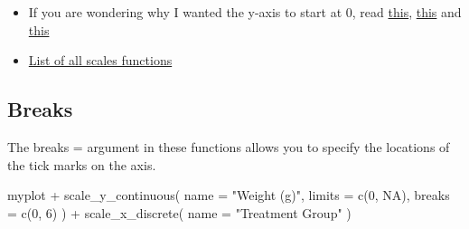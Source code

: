 \documentclass[
  letterpaper,
  DIV=11,
  numbers=noendperiod]{scrartcl}
\newenvironment{Shaded}{\begin{snugshade}}{\end{snugshade}}
\newcommand{\AttributeTok}[1]{\textcolor[rgb]{0.40,0.45,0.13}{#1}}
\newcommand{\ConstantTok}[1]{\textcolor[rgb]{0.56,0.35,0.01}{#1}}
\newcommand{\DecValTok}[1]{\textcolor[rgb]{0.68,0.00,0.00}{#1}}
\newcommand{\FunctionTok}[1]{\textcolor[rgb]{0.28,0.35,0.67}{#1}}
\newcommand{\NormalTok}[1]{\textcolor[rgb]{0.00,0.23,0.31}{#1}}
\newcommand{\SpecialCharTok}[1]{\textcolor[rgb]{0.37,0.37,0.37}{#1}}
\newcommand{\StringTok}[1]{\textcolor[rgb]{0.13,0.47,0.30}{#1}}
\providecommand{\tightlist}{%
  \setlength{\itemsep}{0pt}\setlength{\parskip}{0pt}}\usepackage{longtable,booktabs,array}
\begin{document}
\begin{tcolorbox}[enhanced jigsaw, left=2mm, title=\textcolor{quarto-callout-tip-color}{\faLightbulb}\hspace{0.5em}{Additional Resources}, toprule=.15mm, colback=white, coltitle=black, opacityback=0, breakable, titlerule=0mm, bottomtitle=1mm, toptitle=1mm, colbacktitle=quarto-callout-tip-color!10!white, arc=.35mm, rightrule=.15mm, bottomrule=.15mm, leftrule=.75mm, colframe=quarto-callout-tip-color-frame, opacitybacktitle=0.6]

\begin{itemize}
\tightlist
\item
  If you are wondering why I wanted the y-axis to start at 0, read
  \href{https://academy.datawrapper.de/article/326-why-our-column-and-bar-charts-start-at-zero}{this},
  \href{https://digitalblog.ons.gov.uk/2016/06/27/does-the-axis-have-to-start-at-zero-part-1-line-charts/}{this}
  and
  \href{https://stats.stackexchange.com/questions/184525/how-to-determine-whether-or-not-the-y-axis-of-a-graph-should-start-at-zero}{this}
\item
  \href{https://ggplot2.tidyverse.org/reference/index.html\#scales}{List
  of all scales functions}
\end{itemize}

\end{tcolorbox}

\hypertarget{breaks}{%
\subsection{Breaks}\label{breaks}}

The breaks = argument in these functions allows you to specify the
locations of the tick marks on the axis.

\begin{Shaded}
\begin{Highlighting}[]
\NormalTok{myplot }\SpecialCharTok{+}
  \FunctionTok{scale\_y\_continuous}\NormalTok{(}
    \AttributeTok{name =} \StringTok{"Weight (g)"}\NormalTok{,}
    \AttributeTok{limits =} \FunctionTok{c}\NormalTok{(}\DecValTok{0}\NormalTok{, }\ConstantTok{NA}\NormalTok{),}
    \AttributeTok{breaks =} \FunctionTok{c}\NormalTok{(}\DecValTok{0}\NormalTok{, }\DecValTok{6}\NormalTok{)}
\NormalTok{  ) }\SpecialCharTok{+}
  \FunctionTok{scale\_x\_discrete}\NormalTok{(}
    \AttributeTok{name =} \StringTok{"Treatment Group"}
\NormalTok{  )}
\end{Highlighting}
\end{Shaded}
\end{document}
